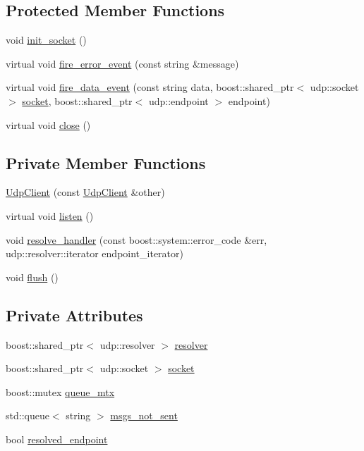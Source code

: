 \subsection*{Protected Member Functions}
\begin{DoxyCompactItemize}
\item 
void \hyperlink{classUdpClient_a4c1f1672598ea18294f2486e071e0985}{init\_\-socket} ()
\item 
virtual void \hyperlink{classUdpClient_ae62b9e08cc550a47bbedca2e4556ebcc}{fire\_\-error\_\-event} (const string \&message)
\item 
virtual void \hyperlink{classUdpClient_acce4181d7ce20a812fffed395486a1bd}{fire\_\-data\_\-event} (const string data, boost::shared\_\-ptr$<$ udp::socket $>$ \hyperlink{classUdpClient_a5e929af056033e7b1fd3f72ad2bd1849}{socket}, boost::shared\_\-ptr$<$ udp::endpoint $>$ endpoint)
\item 
virtual void \hyperlink{classUdpClient_a48cc5f9ce547f5b0505fb8395ac93d32}{close} ()
\end{DoxyCompactItemize}
\subsection*{Private Member Functions}
\begin{DoxyCompactItemize}
\item 
\hyperlink{classUdpClient_a2694066d9e432d68eca656f00152278d}{UdpClient} (const \hyperlink{classUdpClient}{UdpClient} \&other)
\item 
virtual void \hyperlink{classUdpClient_ae62759a7050f171fe12413ec658bb38b}{listen} ()
\item 
void \hyperlink{classUdpClient_a16e67afc411590eb1602fc02e3395599}{resolve\_\-handler} (const boost::system::error\_\-code \&err, udp::resolver::iterator endpoint\_\-iterator)
\item 
void \hyperlink{classUdpClient_a755db78b027af8161b0b79563c857f2f}{flush} ()
\end{DoxyCompactItemize}
\subsection*{Private Attributes}
\begin{DoxyCompactItemize}
\item 
boost::shared\_\-ptr$<$ udp::resolver $>$ \hyperlink{classUdpClient_a1ea233a699d5d1955bb3fa4bfca2ee2f}{resolver}
\item 
boost::shared\_\-ptr$<$ udp::socket $>$ \hyperlink{classUdpClient_a5e929af056033e7b1fd3f72ad2bd1849}{socket}
\item 
boost::mutex \hyperlink{classUdpClient_aa978126795bc551151f6442ba8421fc9}{queue\_\-mtx}
\item 
std::queue$<$ string $>$ \hyperlink{classUdpClient_a8843ba58204e08e3250b483d459b3416}{msgs\_\-not\_\-sent}
\item 
bool \hyperlink{classUdpClient_a342b58425b4ccaf7de2a3ad8dcbc4df8}{resolved\_\-endpoint}
\end{DoxyCompactItemize}


